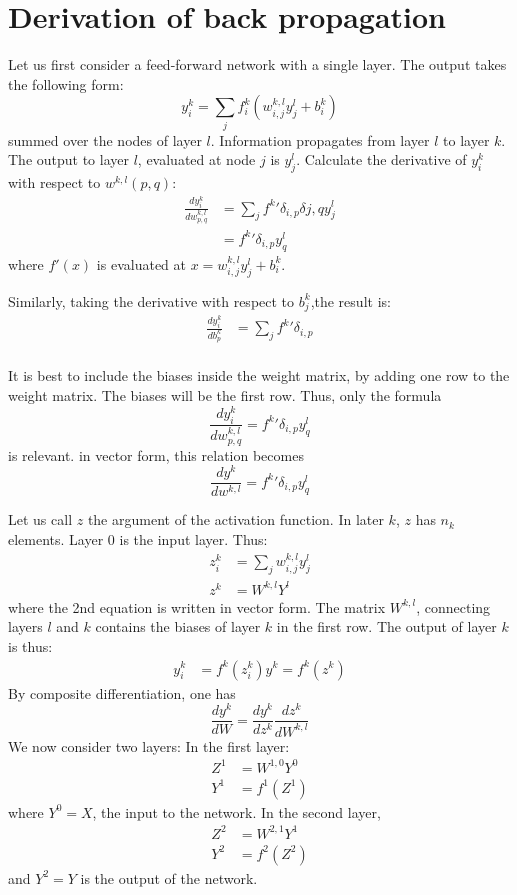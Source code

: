 \documentclass{article}
\begin{document}
\section{Derivation of back propagation}
Let us first consider a feed-forward network with a single layer. The output takes the following form: 
$$
y^k_i = \sum_{j}  f^k_i(w^{k,l}_{i,j} y^l_{j} + b^k_i)
$$
summed over the nodes of layer $l$. 
Information propagates from layer $l$ to layer $k$. The output to layer $l$, evaluated at node $j$ is $y^l_j$. 
Calculate the derivative of $y^k_i$ with respect to $w^{k,l}(p,q)$: 
\begin{align}
\frac{dy^k_i}{dw^{k,l}_{p,q}}
   &= \sum_{j} {f^k}' \delta_{i,p}\delta{j,q} y^l_j \\
   &= {f^k}' \delta_{i,p} y^l_q
\end{align}
where $f'(x)$ is evaluated at $x=w^{k,l}_{i,j} y^l_{j} + b^k_i$. 

Similarly, taking the derivative with respect to $b^k_j$,the result is: 
\begin{align}
\frac{dy^k_i}{db^{k}_{p}}
   &= \sum_{j} {f^k}' \delta_{i,p} \\
\end{align}

It is best to include the biases inside the weight matrix, by adding one row to the weight matrix.
The biases will be the first row. Thus, only the formula 
$$
\frac{dy^k_i}{dw^{k,l}_{p,q}} = {f^k}' \delta_{i,p} y^l_q
$$
is relevant. in vector form, this relation becomes
$$
\frac{dy^k}{dw^{k,l}} = {f^k}' \delta_{i,p} y^l_q
$$

Let us call $z$ the argument of the activation function. In later $k$, $z$ has $n_k$ elements. 
Layer 0 is the input layer. 
Thus: 
\begin{align}
z^k_i &= \sum_j w^{k,l}_{i,j} y^l_{j} \\
z^k   &=  W^{k,l} Y^l
\end{align}
where the 2nd equation is written in vector form. The matrix $W^{k,l}$, connecting layers $l$ and $k$ contains the biases
of layer $k$ in the first row. The output of layer $k$ is thus:
\begin{align}
y^k_i &= f^k(z^k_i)
y^k = f^k(z^k)
\end{align}
By composite differentiation, one has
$$
\frac{dy^k}{dW} = \frac{dy^k}{dz^k} \frac{dz^k}{dW^{k,l}}
$$
We now consider two layers: 
In the first layer: 
\begin{align}
Z^1 &=  W^{1,0} Y^0 \\
Y^1 &= f^1(Z^1)
\end{align}
where $Y^0=X$, the input to the network. 
In the second layer, 
\begin{align}
Z^2 &=  W^{2,1} Y^1 \\
Y^2 &= f^2(Z^2)
\end{align}
and $Y^2=Y$ is the output of the network. 
\end{document}
